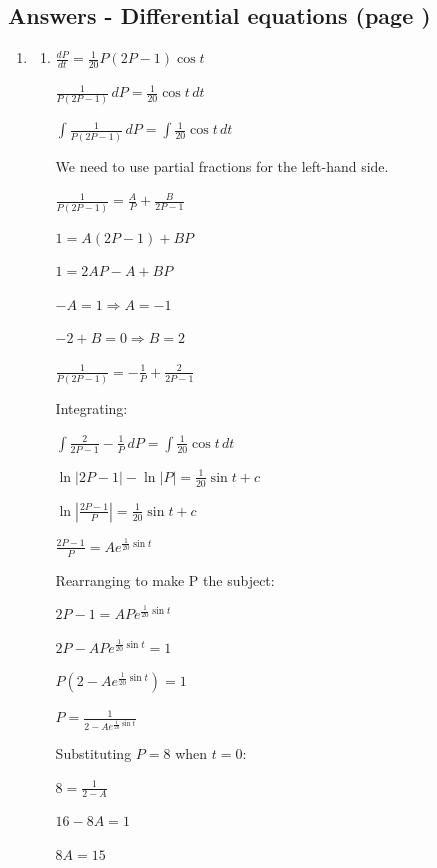 \documentclass[../main.tex]{subfiles}
\begin{document}
\subsection*{Answers - Differential equations (page \pageref{Differential equations})}
\label{Differential equations answers}
\begin{spacing}{1.5}
\begin{enumerate}[itemsep=0.7cm]
    \item 
    \begin{enumerate}[itemsep=0.5cm]
        \item
        
        $\frac{dP}{dt}=\frac{1}{20}P(2P-1)\cos{t}$

        $\frac{1}{P(2P-1)}\,dP=\frac{1}{20}\cos{t}\,dt$

        $\int \frac{1}{P(2P-1)}\,dP=\int \frac{1}{20}\cos{t}\,dt$

        We need to use partial fractions for the left-hand side.

        $\frac{1}{P(2P-1)}=\frac{A}{P}+\frac{B}{2P-1}$

        $1=A(2P-1)+BP$

        $1=2AP-A+BP$

        $-A=1 \Rightarrow A=-1$

        $-2+B=0 \Rightarrow B=2$

        $\frac{1}{P(2P-1)}=-\frac{1}{P}+\frac{2}{2P-1}$

        Integrating:

        $\int \frac{2}{2P-1}-\frac{1}{P}\,dP=\int \frac{1}{20}\cos{t}\,dt$

        $\ln|2P-1|-\ln|P|=\frac{1}{20}\sin{t}+c$

        $\ln|\frac{2P-1}{P}|=\frac{1}{20}\sin{t}+c$

        $\frac{2P-1}{P}=Ae^{\frac{1}{20}\sin{t}}$

        Rearranging to make P the subject:

        $2P-1=APe^{\frac{1}{20}\sin{t}}$

        $2P-APe^{\frac{1}{20}\sin{t}}=1$

        $P(2-Ae^{\frac{1}{20}\sin{t}})=1$

        $P=\frac{1}{2-Ae^{\frac{1}{20}\sin{t}}}$

        Substituting $P=8$ when $t=0$:

        $8=\frac{1}{2-A}$

        $16-8A=1$

        $8A=15$


\end{enumerate}
\end{enumerate}
\end{spacing}
\end{document}
